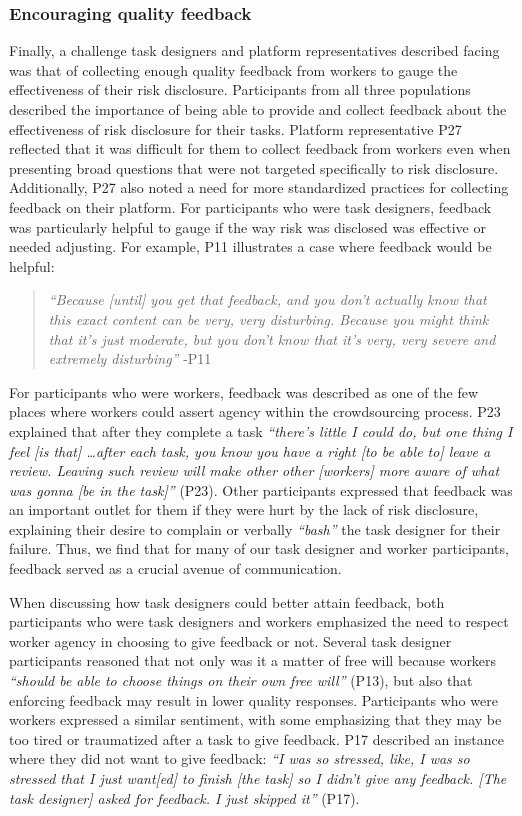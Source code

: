 \subsubsection{Encouraging quality feedback}
Finally, a challenge task designers and platform representatives described facing was that of collecting enough quality feedback from workers to gauge the effectiveness of their risk disclosure. 
Participants from all three populations described the importance of being able to provide and collect feedback about the effectiveness of risk disclosure for their tasks. Platform representative P27 reflected that it was difficult for them to collect feedback from workers even when presenting broad questions that were not targeted specifically to risk disclosure. Additionally, P27 also noted a need for more standardized practices for collecting feedback on their platform. For participants who were task designers, feedback was particularly helpful to gauge if the way risk was disclosed was effective or needed adjusting. For example, P11 illustrates a case where feedback would be helpful: 
\begin{quote}
    \textit{``Because [until] you get that feedback, and you don't actually know that this exact content can be very, very disturbing. Because you might think that it's just moderate, but you don't know that it's very, very severe and extremely disturbing''} -P11
\end{quote}
 For participants who were workers, feedback was described as one of the few places where workers could assert agency within the crowdsourcing process. P23 explained that after they complete a task \textit{``there's little I could do, but one thing I feel [is that] \dots after each task, you know you have a right [to be able to] leave a review. Leaving such review will make other other [workers] more aware of what was gonna [be in the task]''} (P23). Other participants expressed that feedback was an important outlet for them if they were hurt by the lack of risk disclosure, explaining their desire to complain or verbally \textit{``bash''} the task designer for their failure. Thus, we find that for many of our task designer and worker participants, feedback served as a crucial avenue of communication.


When discussing how task designers could better attain feedback, both participants who were task designers and workers emphasized the need to respect worker agency in choosing to give feedback or not. Several task designer participants reasoned that not only was it a matter of free will because workers \textit{``should be able to choose things on their own free will''} (P13), but also that enforcing feedback may result in lower quality responses. Participants who were workers expressed a similar sentiment, with some emphasizing that they may be too tired or traumatized after a task to give feedback. P17 described an instance where they did not want to give feedback: \textit{``I was so stressed, like, I was so stressed that I just want[ed] to finish [the task] so I didn't give any feedback. [The task designer] asked for feedback. I just skipped it''} (P17). 

